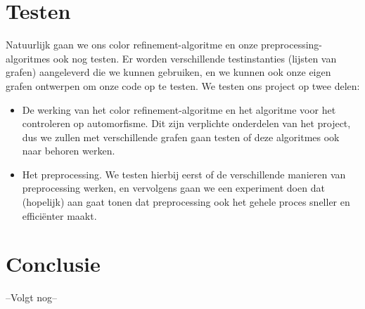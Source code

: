 \documentclass{article}
\begin{document}
\section{Testen}
Natuurlijk gaan we ons color refinement-algoritme en onze preprocessing-algoritmes ook nog testen. Er worden verschillende testinstanties (lijsten van grafen) aangeleverd die we kunnen gebruiken, en we kunnen ook onze eigen grafen ontwerpen om onze code op te testen. We testen ons project op twee delen:
\begin{itemize}
\item De werking van het color refinement-algoritme en het algoritme voor het controleren op automorfisme. Dit zijn verplichte onderdelen van het project, dus we zullen met verschillende grafen gaan testen of deze algoritmes ook naar behoren werken.
\item Het preprocessing. We testen hierbij eerst of de verschillende manieren van preprocessing werken, en vervolgens gaan we een experiment doen dat (hopelijk) aan gaat tonen dat preprocessing ook het gehele proces sneller en effici\"enter maakt.
\end{itemize}
\pagebreak


\section{Conclusie}
--Volgt nog--
\pagebreak


\renewcommand{\refname}{Referenties}


\end{document}
